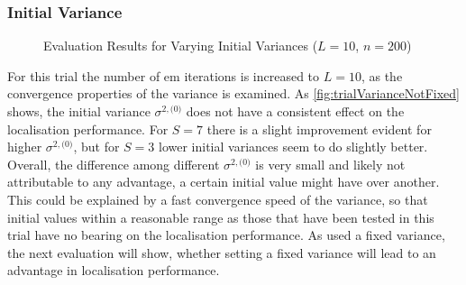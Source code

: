 \subsubsection*{Initial Variance}

\begin{figure}[H]
\iftoggle{quick}{
    \texttt{[image: plots/boxplots/boxplot-joined-var-val-est]}
}{%
    
}
	\caption[Evaluation Results for Varying Initial Variances]{Evaluation Results for Varying Initial Variances ($L=10$, $n=200$)}
	\label{fig:trialVarianceNotFixed}
\end{figure}

For this trial the number of \gls{em} iterations is increased to $L=10$, as the convergence properties of the variance is examined. As \autoref{fig:trialVarianceNotFixed} shows, the initial variance $\sigma^{2, \text{(0)}}$ does not have a consistent effect on the localisation performance. For $S=7$ there is a slight improvement evident for higher $\sigma^{2, \text{(0)}}$, but for $S=3$ lower initial variances seem to do slightly better. Overall, the difference among different $\sigma^{2, \text{(0)}}$ is very small and likely not attributable to any advantage, a certain initial value might have over another. This could be explained by a fast convergence speed of the variance, so that initial values within a reasonable range as those that have been tested in this trial have no bearing on the localisation performance. As \cite{Schwartz2014} used a fixed variance, the next evaluation will show, whether setting a fixed variance will lead to an advantage in localisation performance.